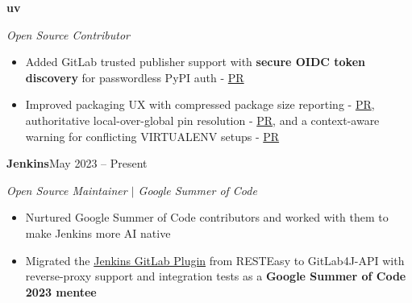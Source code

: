 \documentclass[a4paper,10pt]{article}
\newcommand{\jobheader}[2]{%
    \par\noindent\textbf{#1}\hfill #2\par
}
\newcommand{\jobrole}[1]{%
    \textit{#1}\par
}
\newcommand{\jobgap}{\par\addvspace{8pt}}
\begin{document}
\jobgap
%
\jobheader{uv}{}
\jobrole{Open Source Contributor}
\begin{itemize}
    \item[--] Added GitLab trusted publisher support with \textbf{secure OIDC token discovery} for passwordless PyPI auth - \href{https://github.com/astral-sh/uv/pull/15583}{PR}
    \item[--] Improved packaging UX with compressed package size reporting - \href{https://github.com/astral-sh/uv/pull/15531}{PR}, authoritative local-over-global pin resolution - \href{https://github.com/astral-sh/uv/pull/15473}{PR}, and a context-aware warning for conflicting VIRTUALENV setups - \href{https://github.com/astral-sh/uv/pull/15467}{PR}
\end{itemize}

\jobgap
\jobheader{Jenkins}{May 2023 -- Present}
\jobrole{Open Source Maintainer $|$ Google Summer of Code}
\begin{itemize}
    \item[--] Nurtured Google Summer of Code contributors and worked with them to make Jenkins more AI native
    \item[--] Migrated the \href{https://www.jenkins.io/blog/2023/08/24/gitlab-plugin-modernization-report/}{Jenkins GitLab Plugin} from RESTEasy to GitLab4J-API with reverse-proxy support and integration tests as a \textbf{Google Summer of Code 2023 mentee}
\end{itemize}

\end{document}

